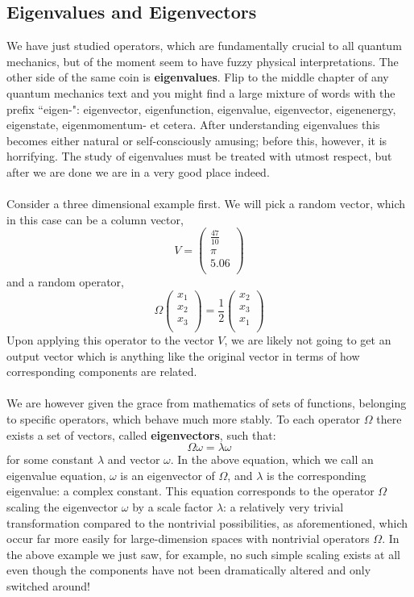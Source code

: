 \subsection{Eigenvalues and Eigenvectors}
We have just studied operators, which are fundamentally crucial to all quantum mechanics, but of the moment seem to have fuzzy physical interpretations. The other side of the same coin is \textbf{eigenvalues}. Flip to the middle chapter of any quantum mechanics text and you might find a large mixture of words with the prefix ``eigen-": eigenvector, eigenfunction, eigenvalue, eigenvector, eigenenergy, eigenstate, eigenmomentum- et cetera. After understanding eigenvalues this becomes either natural or self-consciously amusing; before this, however, it is horrifying. The study of eigenvalues must be treated with utmost respect, but after we are done we are in a very good place indeed.
\\\\
Consider a three dimensional example first. We will pick a random vector, which in this case can be a column vector, 
$$
V=\begin{pmatrix}
\frac{47}{10}\\
\pi\\
5.06\\
\end{pmatrix}
$$
and a random operator, 
$$
\Omega \begin{pmatrix}
x_{1}\\
x_{2}\\
x_{3}\\
\end{pmatrix}=\frac{1}{2}\begin{pmatrix}
x_{2}\\
x_{3}\\
x_{1}\\
\end{pmatrix}
$$
Upon applying this operator to the vector $V$, we are likely not going to get an output vector which is anything like the original vector in terms of how corresponding components are related.
\\\\
We are however given the grace from mathematics of sets of functions, belonging to specific operators, which behave much more stably. To each operator $\Omega$ there exists a set of vectors, called \textbf{eigenvectors}, such that:
$$
\Omega\omega = \lambda\omega
$$
for some constant $\lambda$ and vector $\omega$. In the above equation, which we call an eigenvalue equation, $\omega$ is an eigenvector of $\Omega$, and $\lambda$ is the corresponding eigenvalue: a complex constant. This equation corresponds to the operator $\Omega$ scaling the eigenvector $\omega$ by a scale factor $\lambda$: a relatively very trivial transformation compared to the nontrivial possibilities, as aforementioned, which occur far more easily for large-dimension spaces with nontrivial operators $\Omega$. In the above example we just saw, for example, no such simple scaling exists at all even though the components have not been dramatically altered and only switched around!
